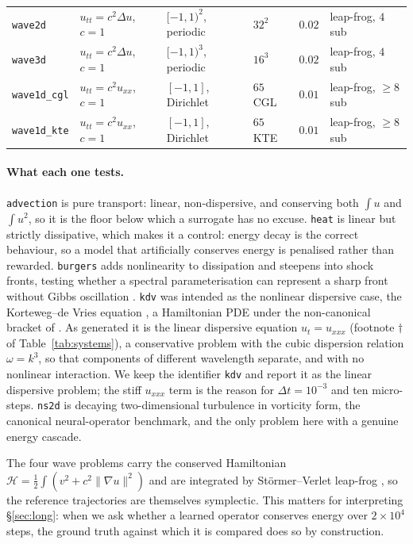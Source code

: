 \documentclass[11pt]{article}
\theoremstyle{definition}
\theoremstyle{remark}
\begin{document}
\begin{table}[htbp]
\begin{tabular}{llllrl}
\texttt{wave2d} & $u_{tt}=c^2\Delta u$, $c=1$ & $[-1,1)^2$, periodic & $32^2$ & $0.02$ & leap-frog, $4$ sub \\
\texttt{wave3d} & $u_{tt}=c^2\Delta u$, $c=1$ & $[-1,1)^3$, periodic & $16^3$ & $0.02$ & leap-frog, $4$ sub \\
\texttt{wave1d\_cgl} & $u_{tt}=c^2u_{xx}$, $c=1$ & $[-1,1]$, Dirichlet & $65$ CGL & $0.01$ & leap-frog, $\ge8$ sub \\
\texttt{wave1d\_kte} & $u_{tt}=c^2u_{xx}$, $c=1$ & $[-1,1]$, Dirichlet & $65$ KTE & $0.01$ & leap-frog, $\ge8$ sub \\
\bottomrule
\end{tabular}
\end{table}

\paragraph{What each one tests.} \texttt{advection} is pure transport: linear,
non-dispersive, and conserving both $\int u$ and $\int u^2$, so it is the floor
below which a surrogate has no excuse. \texttt{heat} is linear but strictly
dissipative, which makes it a control: energy decay is the correct behaviour, so
a model that artificially conserves energy is penalised rather than rewarded.
\texttt{burgers} adds nonlinearity to dissipation \citep{burgers1948} and steepens
into shock fronts, testing whether a spectral parameterisation can represent a
sharp front without Gibbs oscillation \citep{gottlieb1997gibbs}. \texttt{kdv} was
intended as the nonlinear dispersive case, the Korteweg--de Vries equation
\citep{korteweg1895}, a Hamiltonian PDE under the non-canonical bracket of
\citet{gardner1971kdv}. As generated it is the linear dispersive equation
$u_t=u_{xxx}$ (footnote $\dagger$ of Table~\ref{tab:systems}), a conservative
problem with the cubic dispersion relation $\omega=k^{3}$, so that components of
different wavelength separate, and with no nonlinear interaction. We keep the
identifier \texttt{kdv} and report it as the linear dispersive problem; the stiff
$u_{xxx}$ term is the reason for $\Delta t=10^{-3}$ and ten micro-steps.
\texttt{ns2d} is decaying two-dimensional turbulence in vorticity form, the
canonical neural-operator benchmark, and the only problem here with a genuine
energy cascade.

The four wave problems carry the conserved Hamiltonian
$\mathcal{H}=\tfrac12\int(v^2+c^2\lVert\nabla u\rVert^2)$ and are integrated by
St\"ormer--Verlet leap-frog \citep{verlet1967,hairer2006gni}, so the reference
trajectories are themselves symplectic. This matters for interpreting \S\ref{sec:long}: when we ask whether
a learned operator conserves energy over $2\times10^{4}$ steps, the ground truth
against which it is compared does so by construction.
\end{document}
